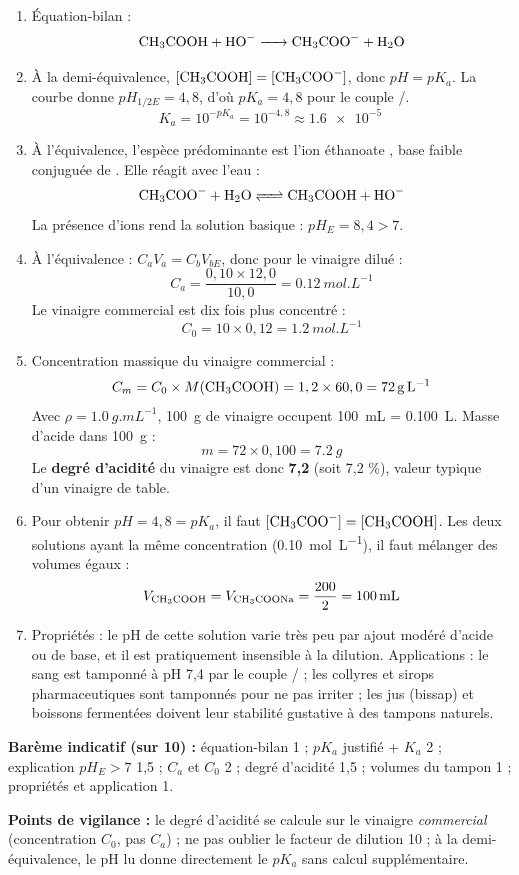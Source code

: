 \documentclass[11pt]{article}
\begin{document}
\begin{corrige}
\begin{enumerate}
\item Équation-bilan :
\[ \ce{CH3COOH + HO- -> CH3COO- + H2O} \]
\item À la demi-équivalence, $[\ce{CH3COOH}] = [\ce{CH3COO-}]$, donc $pH = pK_a$. La courbe donne $pH_{1/2E} = 4,8$, d'où $\boxed{pK_a = 4,8}$ pour le couple /.
\[ K_a = 10^{-pK_a} = 10^{-4,8} \approx \SI{1,6e-5}{} \]
\item À l'équivalence, l'espèce prédominante est l'ion éthanoate , base faible conjuguée de . Elle réagit avec l'eau :
\[ \ce{CH3COO- + H2O <=> CH3COOH + HO-} \]
La présence d'ions  rend la solution basique : $pH_E = 8,4 > 7$.
\item À l'équivalence : $C_a V_a = C_b V_{bE}$, donc pour le vinaigre dilué :
\[ C_a = \frac{0,10 \times 12,0}{10,0} = \SI{0,12}{mol.L^{-1}} \]
Le vinaigre commercial est dix fois plus concentré :
\[ C_0 = 10 \times 0,12 = \SI{1,2}{mol.L^{-1}} \]
\item Concentration massique du vinaigre commercial :
\[ C_m = C_0 \times M(\ce{CH3COOH}) = 1,2 \times 60,0 = \SI{72}{g.L^{-1}} \]
Avec $\rho = \SI{1,0}{g.mL^{-1}}$, \SI{100}{g} de vinaigre occupent \SI{100}{mL} = \SI{0,100}{L}. Masse d'acide dans \SI{100}{g} :
\[ m = 72 \times 0,100 = \SI{7,2}{g} \]
Le \textbf{degré d'acidité} du vinaigre est donc \textbf{7,2} (soit 7,2 \%), valeur typique d'un vinaigre de table.
\item Pour obtenir $pH = 4,8 = pK_a$, il faut $[\ce{CH3COO-}] = [\ce{CH3COOH}]$. Les deux solutions ayant la même concentration (\SI{0,10}{mol.L^{-1}}), il faut mélanger des volumes égaux :
\[ V_{\ce{CH3COOH}} = V_{\ce{CH3COONa}} = \frac{200}{2} = \SI{100}{mL} \]
\item Propriétés : le pH de cette solution varie très peu par ajout modéré d'acide ou de base, et il est pratiquement insensible à la dilution. Applications : le sang est tamponné à pH 7,4 par le couple / ; les collyres et sirops pharmaceutiques sont tamponnés pour ne pas irriter ; les jus (bissap) et boissons fermentées doivent leur stabilité gustative à des tampons naturels.
\end{enumerate}
\textbf{Barème indicatif (sur 10) :} équation-bilan 1 ; $pK_a$ justifié + $K_a$ 2 ; explication $pH_E > 7$ 1,5 ; $C_a$ et $C_0$ 2 ; degré d'acidité 1,5 ; volumes du tampon 1 ; propriétés et application 1.

\textbf{Points de vigilance :} le degré d'acidité se calcule sur le vinaigre \emph{commercial} (concentration $C_0$, pas $C_a$) ; ne pas oublier le facteur de dilution 10 ; à la demi-équivalence, le pH lu donne directement le $pK_a$ sans calcul supplémentaire.
\end{corrige}
\end{document}
